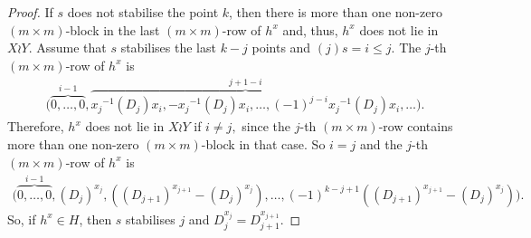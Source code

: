 \begin{proof}
   If $s$ does not stabilise the point $k$, then there is more than one non-zero $(m \times m)$-block in the last $(m \times m)$-row of $h^{x}$ and, thus, $h^{x}$ does not lie in   $ X \wr Y.$
Assume that $s$ stabilises the last ${k-j}$ points and $(j)s=i \le j.$ The  $j$-th $(m \times m)$-row of $h^{x}$ is 
\begin{equation*}	
\begin{split}
\bigl( \overbrace{0, \ldots, 0}^{i-1},  \overbrace{{x_j}^{-1}(D_{j}){x_i},-{x_j}^{-1}(D_{j}){x_i},  \ldots,(-1)^{j-i} {x_j}^{-1}(D_{j}){x_i}}^{j+1-i}, \ldots \bigr).
\end{split}
\end{equation*}
Therefore, $h^x$ does not lie in $X \wr Y$ if $i \ne j,$ since the $j$-th  $(m \times m)$-row contains more than one non-zero $(m \times m)$-block in that case. So $i=j$ and the  $j$-th $(m \times m)$-row of $h^{x}$ is
\begin{equation*}
\begin{split}
\bigl( \overbrace{0, \ldots, 0}^{i-1},  (D_{j})^{x_j},   
( ( D_{j+1})^{x_{j+1}} -(D_{j})^{x_j}  ) ,  \ldots, (-1)^{k-j+1}((D_{j+1})^{x_{j+1}} - (D_{j})^{x_j}  ) \bigr).
\end{split}
\end{equation*}
 So, if $h^x \in H$, then $s$ stabilises $j$ and $D_{j}^{{x_j}}=D_{j+1}^{x_{j+1}}.$
\end{proof}

 

